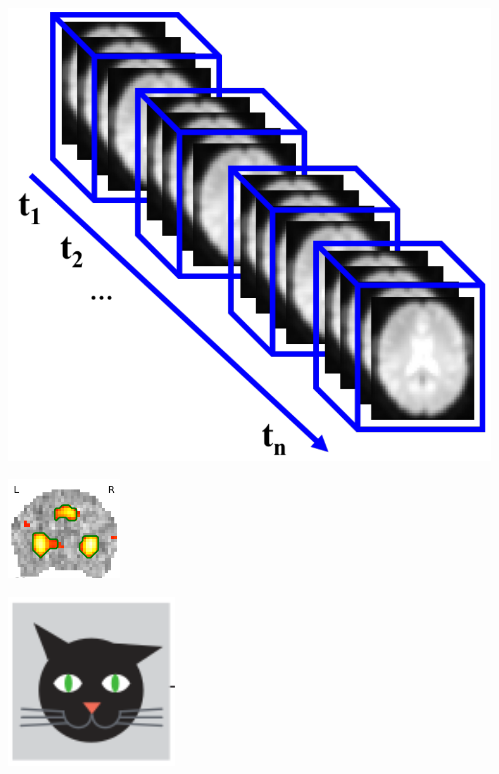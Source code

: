 \documentclass{beamer}
\def\B#1{\mathbf{#1}}
\begin{document}
\begin{frame}
\begin{columns}
\begin{column}{7cm}
\end{column}

\begin{column}{4cm}

    \includegraphics[width=.8\linewidth]{X.png}


    
    \includegraphics[width=.5\linewidth]{structure.png}


    \bigskip
    
    \includegraphics[width=.4\linewidth]{cat.png}


\end{column}
\end{columns}
\end{frame}
\end{document}
